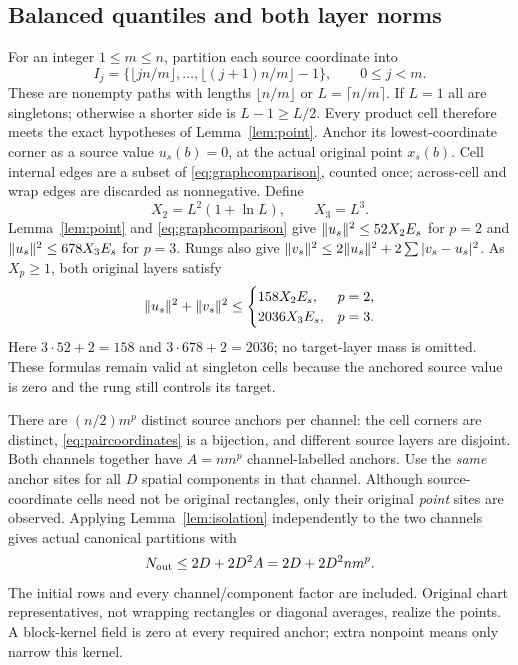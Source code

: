 \subsection{Balanced quantiles and both layer norms}
For an integer $1\leq m\leq n$, partition each source coordinate into
\[
 I_j=\{\lfloor jn/m\rfloor,\ldots,\lfloor(j+1)n/m\rfloor-1\},
 \qquad0\leq j<m.
\]
These are nonempty paths with lengths $\lfloor n/m\rfloor$ or
$L=\lceil n/m\rceil$. If $L=1$ all are singletons; otherwise a shorter side
is $L-1\geq L/2$. Every product cell therefore meets the exact hypotheses
of Lemma~\ref{lem:point}. Anchor its lowest-coordinate corner as a source
value $u_s(b)=0$, at the actual original point $x_s(b)$.
Cell internal edges are a subset of \eqref{eq:graphcomparison}, counted once;
across-cell and wrap edges are discarded as nonnegative.
Define
\[
 X_2=L^2(1+\ln L),\qquad X_3=L^3.
\]
Lemma~\ref{lem:point} and \eqref{eq:graphcomparison} give
$\lVert u_s\rVert^2\leq52X_2E_s$ for $p=2$ and
$\lVert u_s\rVert^2\leq678X_3E_s$ for $p=3$.
Rungs also give $\lVert v_s\rVert^2\leq2\lVert u_s\rVert^2+2\sum|v_s-u_s|^2$.
As $X_p\geq1$, both original layers satisfy
\begin{equation}\label{eq:pairnorm}
 \lVert u_s\rVert^2+\lVert v_s\rVert^2\leq
 \begin{cases}158X_2E_s,&p=2,\\2036X_3E_s,&p=3.\end{cases}
\end{equation}
Here $3\cdot52+2=158$ and $3\cdot678+2=2036$; no target-layer mass is omitted.
These formulas remain valid at singleton cells because the anchored source
value is zero and the rung still controls its target.

There are $(n/2)m^p$ distinct source anchors per channel: the cell corners
are distinct, \eqref{eq:paircoordinates} is a bijection, and different source
layers are disjoint. Both channels together have $A=nm^p$ channel-labelled
anchors. Use the \emph{same} anchor sites for all $D$ spatial components in
that channel. Although source-coordinate cells need not be original rectangles,
only their original \emph{point} sites are observed. Applying
Lemma~\ref{lem:isolation} independently to the two channels gives actual
canonical partitions with
\begin{equation}\label{eq:pointcount}
 N_{\rm out}\leq2D+2D^2A=2D+2D^2nm^p.
\end{equation}
The initial rows and every channel/component factor are included. Original
chart representatives, not wrapping rectangles or diagonal averages, realize
the points. A block-kernel field is zero at every required anchor; extra
nonpoint means only narrow this kernel.

